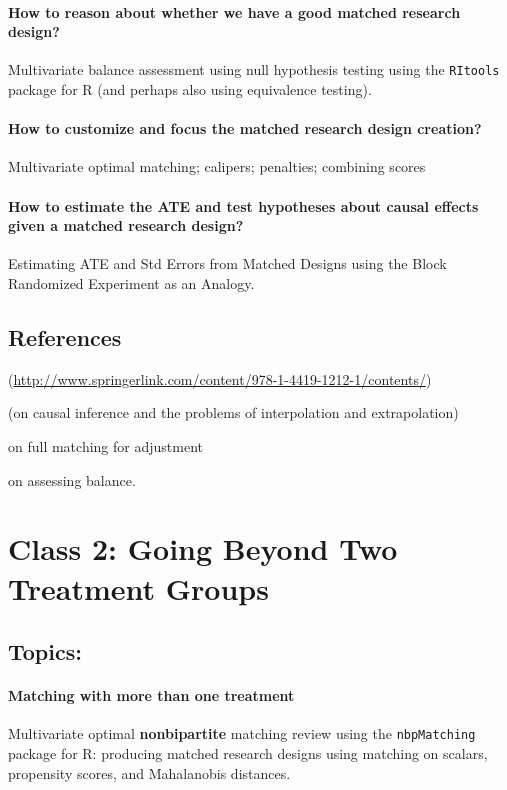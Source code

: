 \documentclass[10pt]{article}
\begin{document}
\paragraph*{How to reason about whether we have a good matched research design?}
Multivariate balance assessment using null hypothesis testing using the
\texttt{RItools} package for R (and perhaps also using equivalence testing).

\paragraph*{How to customize and focus the matched research design creation?}
Multivariate optimal matching; calipers; penalties; combining scores


\paragraph*{How to estimate the ATE  and test hypotheses about causal effects
given a matched research design?} Estimating ATE and Std Errors from Matched
Designs using the Block Randomized Experiment as an Analogy.

\subsection*{References}

\citealp[Chap 1,3,7,8,9,13]{rosenbaum2010design}  (\url{http://www.springerlink.com/content/978-1-4419-1212-1/contents/})

\citealp[Chap 9.0--9.2]{gelman2007dau} (on causal inference and the problems of interpolation and extrapolation)

\citealp{hansen:2004} on full matching for adjustment

\citealp{hansen2008cbs} on assessing balance.


\section*{Class 2: Going Beyond Two Treatment Groups}

\subsection*{Topics:}

\paragraph*{Matching with more than one treatment}  \vspace{-1.5em} Multivariate optimal \textbf{nonbipartite} matching review using the \texttt{nbpMatching} package for R: producing matched research designs using matching on scalars, propensity scores, and Mahalanobis distances.
\end{document}
